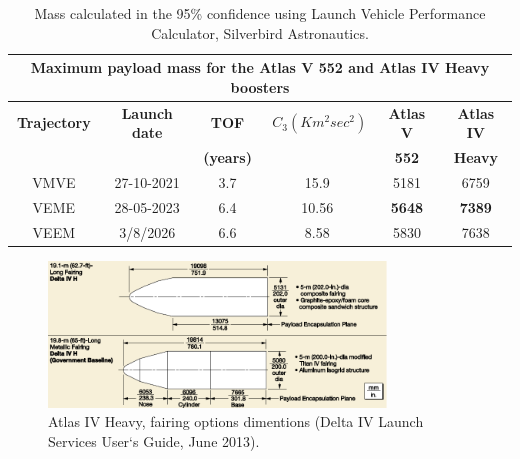 \begin{table}[htb!]
  \centering
    \begin{tabular}{|c|r|r|r|r|r|}
    \multicolumn{6}{c}{\textbf{Maximum payload mass for the Atlas V 552 and Atlas IV Heavy boosters}} \bigstrut[b]\\
    \hline
    \textbf{Trajectory} & \multicolumn{1}{c|}{\textbf{Launch date}} & \multicolumn{1}{c|}{\textbf{TOF }} & $C_3(Km^{2}sec^{2})$ & \multicolumn{1}{c|}{\textbf{Atlas V }} & \multicolumn{1}{c|}{\textbf{Atlas IV}} \bigstrut[t]\\
    \textbf{} & \multicolumn{1}{c|}{\textbf{}} & \multicolumn{1}{c|}{\textbf{(years)}} & \multicolumn{1}{c|}{\textbf{}} & \multicolumn{1}{c|}{\textbf{552}} & \multicolumn{1}{c|}{\textbf{Heavy}} \bigstrut[b]\\
    \hline
    VMVE  & \multicolumn{1}{c|}{27-10-2021} & \multicolumn{1}{c|}{3.7} & \multicolumn{1}{c|}{15.9} & \multicolumn{1}{c|}{5181} & \multicolumn{1}{c|}{6759} \bigstrut\\
    \hline
    VEME  & \multicolumn{1}{c|}{28-05-2023} & \multicolumn{1}{c|}{6.4} & \multicolumn{1}{c|}{10.56} & \multicolumn{1}{c|}{\textbf{5648}} & \multicolumn{1}{c|}{\textbf{7389}} \bigstrut\\
    \hline
    VEEM  & \multicolumn{1}{c|}{3/8/2026} & \multicolumn{1}{c|}{6.6} & \multicolumn{1}{c|}{8.58} & \multicolumn{1}{c|}{5830} & \multicolumn{1}{c|}{7638} \bigstrut\\
    \hline
    \end{tabular}%
    \caption{Mass calculated in the 95\% confidence using Launch Vehicle Performance Calculator, Silverbird Astronautics.}
  \label{tab:trajKg}%
\end{table}%

\begin{figure}[htb!]
\centering
\includegraphics[width=0.8\textwidth]{figures/Orbiter/fairingsIV.png}
\caption{Atlas IV Heavy, fairing options dimentions (Delta IV Launch Services User‘s Guide, June 2013).\cite{Atlasm}}
\end{figure}

